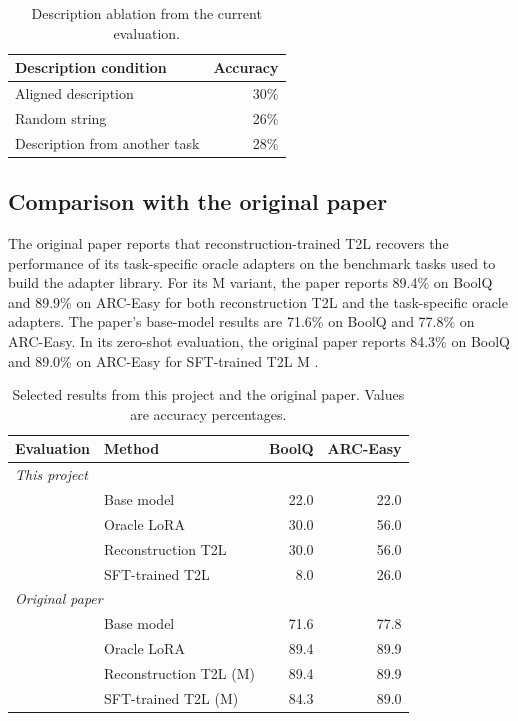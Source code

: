 \documentclass{article}
\begin{document}
\begin{table}[t]
\centering
\caption{Description ablation from the current evaluation.}
\label{tab:our-ablation}
\begin{tabular}{lr}
\toprule
Description condition & Accuracy \\
\midrule
Aligned description & 30\% \\
Random string & 26\% \\
Description from another task & 28\% \\
\bottomrule
\end{tabular}
\end{table}

\subsection{Comparison with the original paper}

The original paper reports that reconstruction-trained T2L recovers the performance of its task-specific oracle adapters on the benchmark tasks used to build the adapter library. For its M variant, the paper reports 89.4\% on BoolQ and 89.9\% on ARC-Easy for both reconstruction T2L and the task-specific oracle adapters. The paper's base-model results are 71.6\% on BoolQ and 77.8\% on ARC-Easy. In its zero-shot evaluation, the original paper reports 84.3\% on BoolQ and 89.0\% on ARC-Easy for SFT-trained T2L M \cite{charakorn2025texttolora}.

\begin{table}[t]
\centering
\caption{Selected results from this project and the original paper. Values are accuracy percentages.}
\label{tab:paper-comparison}
\begin{tabular}{llrr}
\toprule
Evaluation & Method & BoolQ & ARC-Easy \\
\midrule
\multicolumn{4}{l}{\textit{This project}} \\
& Base model & 22.0 & 22.0 \\
& Oracle LoRA & 30.0 & 56.0 \\
& Reconstruction T2L & 30.0 & 56.0 \\
& SFT-trained T2L & 8.0 & 26.0 \\
\midrule
\multicolumn{4}{l}{\textit{Original paper}} \\
& Base model & 71.6 & 77.8 \\
& Oracle LoRA & 89.4 & 89.9 \\
& Reconstruction T2L (M) & 89.4 & 89.9 \\
& SFT-trained T2L (M) & 84.3 & 89.0 \\
\bottomrule
\end{tabular}
\end{table}
\end{document}
